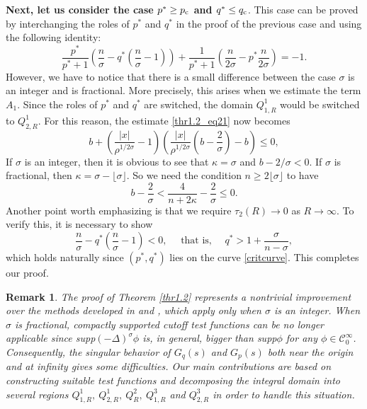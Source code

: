 \documentclass[11pt,reqno]{amsart}
\newcommand{\tron}[1]{\left( #1 \right)}
\numberwithin{equation}{section}
\newtheorem{remark}{Remark}[section]
\newcommand{\flo}[1]{\lfloor #1 \rfloor }
\begin{document}
{\bf Next, let us consider the case $p^*\geq p_{\rm c}$ and $q^*\leq q_{\rm c}$}. 
This case can be proved by interchanging the roles of $p^*$ and $q^*$ in the proof of the previous case and using the following identity:
\[
\frac{p^*}{p^*+1}\tron{\frac{n}{\sigma}-q^*\tron{\frac{n}{\sigma}-1}}+\frac{1}{p^*+1}\tron{\frac{n}{2\sigma}-p^*\frac{n}{2\sigma}}=-1.
\]
However, we have to notice that there is a small difference between the case $\sigma$ is an integer and is fractional. More precisely, this arises when we estimate the term $A_1$. Since the roles of $p^*$ and $q^*$ are switched, the domain $Q^1_{1,R}$ would be switched to $Q^1_{2,R}$. For this reason, the estimate \eqref{thr1.2_eq21} now becomes
\[
b+\tron{\frac{|x|}{\rho^{1/2\sigma}}-1}\tron{\frac{|x|}{\rho^{1/2\sigma}}\tron{b-\frac{2}{\sigma}}-b}\leq 0,
\]
If $\sigma$ is an integer, then it is  obvious to see that $\kappa=\sigma$ and $b-2/\sigma<0$. If $\sigma$ is fractional, then $\kappa=\sigma-\flo{\sigma}$. So we need the condition $n\geq 2\flo{\sigma}$ to have
\[
b-\frac{2}{\sigma}<\frac{4}{n+2\kappa}-\frac{2}{\sigma}\leq 0.
\]
Another point worth emphasizing is that we require $\tau_2(R) \to 0$ as $R \to \infty$. To verify this, it is necessary to show
\[
\frac{n}{\sigma} - q^* \left( \frac{n}{\sigma} - 1 \right) < 0, \quad \text{ that is, }\quad q^* > 1 + \frac{\sigma}{n - \sigma},
\]
which holds naturally since $(p^*, q^*)$ lies on the curve \eqref{critcurve}. This completes our proof.
\begin{remark}
{\rm
The proof of Theorem \ref{thr1.2} represents a nontrivial improvement over the methods developed in \cite{TangDaoCung2026} and \cite{AnhRei2021}, which apply only when $\sigma$ is an integer. When $\sigma$ is fractional, compactly supported cutoff test functions can be no longer applicable since supp$(-\Delta)^\sigma \phi$ is, in general, bigger than supp$\phi$ for any $\phi \in \mathcal{C}_0^\infty$. Consequently, the singular behavior of $G_q(s)$ and $G_p(s)$ both near the origin and at infinity gives some difficulties. Our main contributions are based on constructing suitable test functions and decomposing the integral domain into several regions $Q^1_{1,R},\ Q^1_{2,R},\ Q^2_{R},\ Q^3_{1,R}$ and $Q^3_{2,R}$ in order to handle this situation.
}    
\end{remark}
\end{document}
